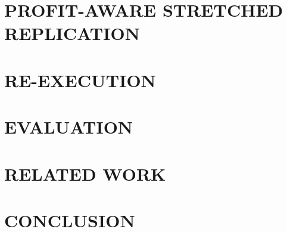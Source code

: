 \documentclass[a4paper,twoside]{article}
\begin{document}
\section{\uppercase{Profit-aware stretched replication}}
\label{sec:reward_model_2}


\section{\uppercase{Re-execution}}
\label{sec:reward_model_3}


\section{\uppercase{Evaluation}}
\label{sec:evaluation}


\section{\uppercase{Related Work}}
\label{sec:related_work}


\section{\uppercase{Conclusion}}
\label{sec:conclusion}



{\small
}



\vfill
\end{document}
